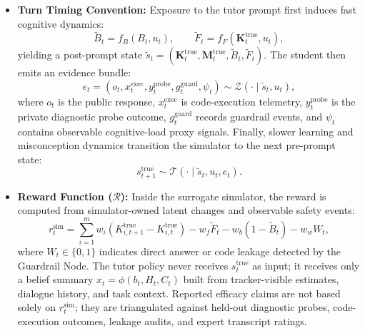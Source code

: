 \documentclass[11pt,a4paper]{report}
\begin{document}
\begin{itemize}
    \item \textbf{Turn Timing Convention:} Exposure to the tutor prompt first induces fast cognitive dynamics:
    \begin{equation}
        \tilde{B}_t = f_B(B_t, u_t), \qquad
        \tilde{F}_t = f_F(\mathbf{K}_t^{\text{true}}, u_t),
    \end{equation}
    yielding a post-prompt state $\tilde{s}_t = (\mathbf{K}_t^{\text{true}}, \mathbf{M}_t^{\text{true}}, \tilde{B}_t,\tilde{F}_t)$. The student then emits an evidence bundle:
    \begin{equation}
        e_t = (o_t, x_t^{\text{exec}}, y_t^{\text{probe}}, g_t^{\text{guard}}, \psi_t) \sim
        \mathcal{Z}(\cdot \mid \tilde{s}_t, u_t),
    \end{equation}
    where $o_t$ is the public response, $x_t^{\text{exec}}$ is code-execution telemetry, $y_t^{\text{probe}}$ is the private diagnostic probe outcome, $g_t^{\text{guard}}$ records guardrail events, and $\psi_t$ contains observable cognitive-load proxy signals. Finally, slower learning and misconception dynamics transition the simulator to the next pre-prompt state:
    \begin{equation}
        s_{t+1}^{\text{true}} \sim \mathcal{T}(\cdot \mid \tilde{s}_t, u_t, e_t).
    \end{equation}

    \item \textbf{Reward Function ($\mathcal{R}$):} Inside the surrogate simulator, the reward is computed from simulator-owned latent changes and observable safety events:
    \begin{equation}
        r_t^{\text{sim}} =
        \sum_{i=1}^m w_i \left(K^{\text{true}}_{i,t+1} - K^{\text{true}}_{i,t}\right)
        - w_f \tilde{F}_t - w_b(1-\tilde{B}_t) - w_w W_t,
    \end{equation}
    where $W_t \in \{0,1\}$ indicates direct answer or code leakage detected by the Guardrail Node. The tutor policy never receives $s_t^{\text{true}}$ as input; it receives only a belief summary $x_t = \phi(b_t,H_t,C_t)$ built from tracker-visible estimates, dialogue history, and task context. Reported efficacy claims are not based solely on $r_t^{\text{sim}}$; they are triangulated against held-out diagnostic probes, code-execution outcomes, leakage audits, and expert transcript ratings.


\end{itemize}
\end{document}
